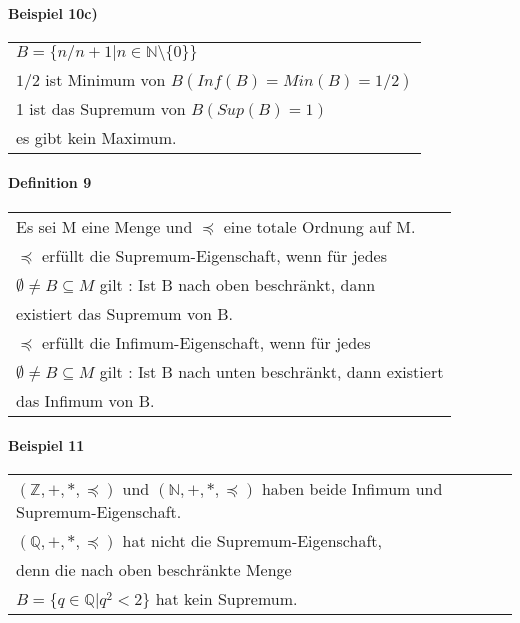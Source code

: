 \documentclass[a4paper]{scrartcl}
\begin{document}
\paragraph{Beispiel 10c)}
\begin{tabbing}
\begin{tabular}{l}
$B = \{ n/n+1 | n\in\mathbb{N}\setminus\{ 0 \}\}$\\
$1/2$ ist Minimum von $B(Inf(B)=Min(B)=1/2)$\\
1 ist das Supremum von $B(Sup(B)=1)$\\
es gibt kein Maximum.
\end{tabular}
\end{tabbing}

\paragraph{Definition 9}
\begin{tabbing}
\begin{tabular}{l}
Es sei M eine Menge und $\preceq$ eine totale Ordnung auf M.\\
$\preceq$ erfüllt die Supremum-Eigenschaft, wenn für jedes\\
$\emptyset\neq B\subseteq M$ gilt : Ist B nach oben beschränkt, dann\\
existiert das Supremum von B.\\
$\preceq$ erfüllt die Infimum-Eigenschaft, wenn für jedes\\
$\emptyset\neq B\subseteq M$ gilt : Ist B nach unten beschränkt, dann existiert\\
das Infimum von B.
\end{tabular}
\end{tabbing}

\paragraph{Beispiel 11}
\begin{tabbing}
\begin{tabular}{l}
$(\mathbb{Z},+,*,\preceq)$ und $(\mathbb{N},+,*,\preceq)$ haben beide Infimum und Supremum-Eigenschaft.\\
$(\mathbb{Q},+,*,\preceq)$ hat nicht die Supremum-Eigenschaft,\\
denn die nach oben beschränkte Menge\\
$B=\{q\in\mathbb{Q} | q^2 < 2\}$ hat kein Supremum.
\end{tabular}
\end{tabbing}
\end{document}
